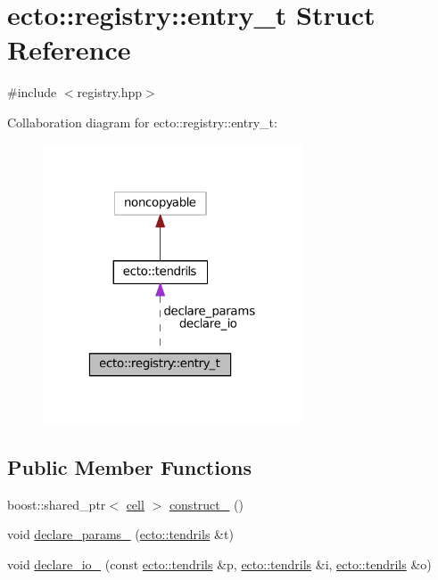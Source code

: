 \hypertarget{structecto_1_1registry_1_1entry__t}{\section{ecto\-:\-:registry\-:\-:entry\-\_\-t Struct Reference}
\label{structecto_1_1registry_1_1entry__t}
}


{\ttfamily \#include $<$registry.\-hpp$>$}



Collaboration diagram for ecto\-:\-:registry\-:\-:entry\-\_\-t\-:\nopagebreak
\begin{figure}[H]
\begin{center}
\leavevmode
\includegraphics[width=220pt]{structecto_1_1registry_1_1entry__t__coll__graph}
\end{center}
\end{figure}
\subsection*{Public Member Functions}
\begin{DoxyCompactItemize}
\item 
boost\-::shared\-\_\-ptr$<$ \hyperlink{structecto_1_1cell}{cell} $>$ \hyperlink{structecto_1_1registry_1_1entry__t_a6690e4cc01562d27df2cca184cdd06e0}{construct\-\_\-} ()
\item 
void \hyperlink{structecto_1_1registry_1_1entry__t_af0aeb9fd69fc09b5a2b5f82841cba647}{declare\-\_\-params\-\_\-} (\hyperlink{classecto_1_1tendrils}{ecto\-::tendrils} \&t)
\item 
void \hyperlink{structecto_1_1registry_1_1entry__t_a079fd7bed79b335a8fa74c68a4ccf988}{declare\-\_\-io\-\_\-} (const \hyperlink{classecto_1_1tendrils}{ecto\-::tendrils} \&p, \hyperlink{classecto_1_1tendrils}{ecto\-::tendrils} \&i, \hyperlink{classecto_1_1tendrils}{ecto\-::tendrils} \&o)
\end{DoxyCompactItemize}
